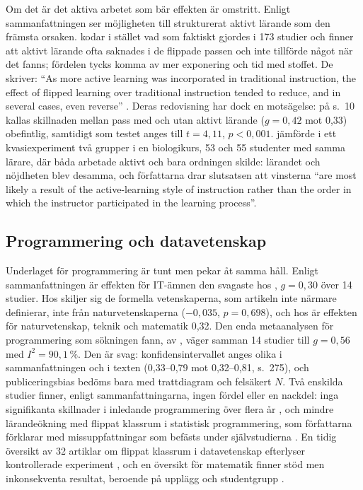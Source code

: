 Om det är det aktiva arbetet som bär effekten är omstritt. Enligt
sammanfattningen ser \textcite{Strelan2020} möjligheten till strukturerat
aktivt lärande som den främsta orsaken. \textcite{Kapur2022} kodar i
stället vad som faktiskt gjordes i 173 studier och finner att aktivt
lärande ofta saknades i de flippade passen och inte tillförde något när
det fanns; fördelen tycks komma av mer exponering och tid med stoffet.
De skriver: \enquote{As more active learning was incorporated in
traditional instruction, the effect of flipped learning over traditional
instruction tended to reduce, and in several cases, even reverse}
\parencite[12]{Kapur2022}. Deras redovisning har dock en motsägelse: på
s.~10 kallas skillnaden mellan pass med och utan aktivt lärande
(\(g = 0{,}42\) mot 0,33) obefintlig, samtidigt som testet anges till
\(t = 4{,}11\), \(p < 0{,}001\). \textcite{Jensen2015} jämförde i ett
kvasiexperiment två grupper i en biologikurs, 53 och 55 studenter med
samma lärare, där båda arbetade aktivt och bara ordningen skilde:
lärandet och nöjdheten blev desamma, och författarna drar slutsatsen att
vinsterna \enquote{are most likely a result of the active-learning style
of instruction rather than the order in which the instructor participated
in the learning process}.

\subsection{Programmering och datavetenskap}

Underlaget för programmering är tunt men pekar åt samma håll. Enligt
sammanfattningen är effekten för IT-ämnen den svagaste hos
\textcite{Strelan2020}, \(g = 0{,}30\) över 14 studier. Hos
\textcite[tabell~4, s.~11]{vanAlten2019} skiljer sig de formella
vetenskaperna, som artikeln inte närmare definierar, inte från
naturvetenskaperna (\(-0{,}035\), \(p = 0{,}698\)), och hos
\textcite[7]{LagSaele2019} är effekten för naturvetenskap, teknik och
matematik 0,32. Den enda metaanalysen för programmering som sökningen
fann, av \textcite[267, 276]{AlmassriZaharudin2023}, väger samman 14
studier till \(g = 0{,}56\) med \(I^2 = 90{,}1\,\%\). Den är svag:
konfidensintervallet anges olika i sammanfattningen och i texten
(0,33--0,79 mot 0,32--0,81, s.~275), och publiceringsbias bedöms bara med
trattdiagram och felsäkert \(N\). Två enskilda studier finner, enligt sammanfattningarna, ingen
fördel eller en nackdel: inga signifikanta skillnader i inledande
programmering över flera år \parencite{Tyler2018}, och mindre
lärandeökning med flippat klassrum i statistisk programmering, som
författarna förklarar med missuppfattningar som befästs under
självstudierna \parencite{Liu2026}. En tidig översikt av 32 artiklar om
flippat klassrum i datavetenskap efterlyser kontrollerade experiment
\parencite{Giannakos2014}, och en översikt för matematik finner stöd men
inkonsekventa resultat, beroende på upplägg och studentgrupp
\parencite{Jones2026}.


